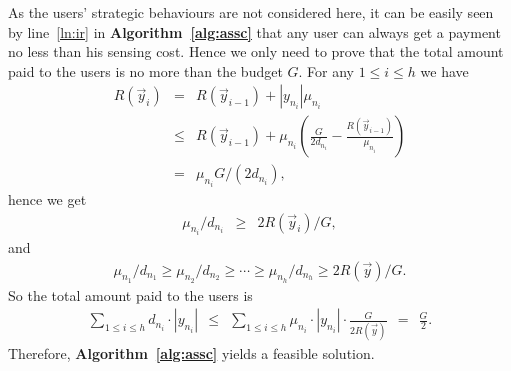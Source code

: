 \documentclass[10pt,journal,compsoc]{IEEEtran}
\begin{document}
\begin{IEEEproof}
As the users' strategic behaviours are not considered here, it can be easily seen by line~\ref{ln:ir} in \textbf{Algorithm~\ref{alg:assc}} that any user can always get a payment no less than his sensing cost. Hence we only need to prove that the total amount paid to the users is no more than the budget $G$. For any $1\leq i\leq h$ we have
\begin{eqnarray}
    R(\vec{y}_{i})&=& R(\vec{y}_{{i-1}})+|y_{n_i}|\mu_{n_i} \nonumber\\
    &\leq& R(\vec{y}_{{i-1}})+\mu_{n_i}\left(\frac{G}{2d_{n_i}}-\frac{R(\vec{y}_{{i-1}})}{\mu_{n_i}}\right)\nonumber\\
    &=&{\mu_{n_i}G}/({2d_{n_i}}), \nonumber
  \end{eqnarray}
hence we get
\begin{eqnarray}
    {\mu_{n_i}}/{d_{n_i}} &\geq& {2R(\vec{y}_{i})}/{G}, \label{eqn:xinjia}
  \end{eqnarray}
and
\begin{eqnarray}
    {\mu_{n_1}}/{d_{n_1}}\geq {\mu_{n_2}}/{d_{n_2}}\geq \cdots \geq {\mu_{n_h}}/{d_{n_h}}\geq {2R(\vec{y})}/{G}.\nonumber
  \end{eqnarray}
So the total amount paid to the users is
\begin{eqnarray}
    \sum_{1\leq i\leq h} d_{n_i}\cdot |y_{n_i}|~~\leq~~\sum_{1\leq i\leq h} \mu_{n_i}\cdot |y_{n_i}|\cdot \frac{G}{2R(\vec{y})}~~=~~\frac{G}{2}. \label{eqn:totallesshalfg}
  \end{eqnarray}
Therefore, \textbf{Algorithm~\ref{alg:assc}} yields a feasible solution.
\end{IEEEproof}
\end{document}
